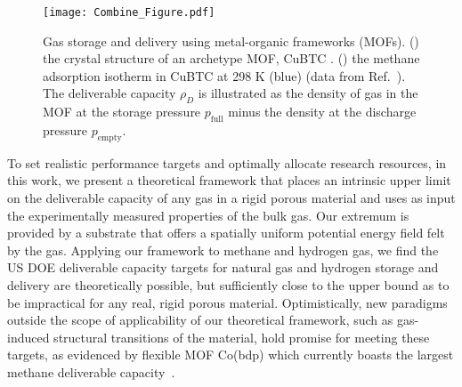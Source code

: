 \documentclass[twoside,twocolumn,9pt]{article}
\newcommand\pfull{\ensuremath{p_{\text{full}}}}
\newcommand\pempty{\ensuremath{p_{\text{empty}}}}
\begin{document}
\begin{figure}
    \centering
    \texttt{[image: Combine\_Figure.pdf]}
    \begin{minipage}{0.25\textwidth}
    \end{minipage}
    \begin{minipage}{0.25\textwidth}
    \end{minipage}
    
    \caption{\label{fig:fig1} Gas storage and delivery using metal-organic frameworks (MOFs). () the crystal structure of an archetype MOF, CuBTC \cite{chui1999chemically}. () the methane adsorption isotherm in CuBTC \cite{chui1999chemically} at 298 K (blue) (data from Ref.~\cite{mason2014evaluating}). The deliverable capacity $\rho_D$ is illustrated as the density of gas in the MOF at the storage pressure $\pfull$ minus the density at the discharge pressure $\pempty$.}
\end{figure}

To set realistic performance targets and optimally allocate research resources,
in this work, we present a theoretical framework that places an intrinsic upper
limit on the deliverable capacity of any gas in a rigid porous material and
uses as input the experimentally measured properties of the bulk gas. Our
extremum is provided by a substrate that offers a spatially uniform potential
energy field felt by the gas. Applying our framework to methane and hydrogen
gas, we find the US DOE deliverable capacity targets for natural gas and
hydrogen storage and delivery are theoretically possible, but sufficiently
close to the upper bound as to be impractical for any real, rigid porous
material. Optimistically, new paradigms outside the scope of applicability of
our theoretical framework, such as gas-induced structural transitions of the
material, hold promise for meeting these targets, as evidenced by flexible MOF
Co(bdp) which currently boasts the largest methane deliverable
capacity~\cite{mason2015methane}.
\end{document}
